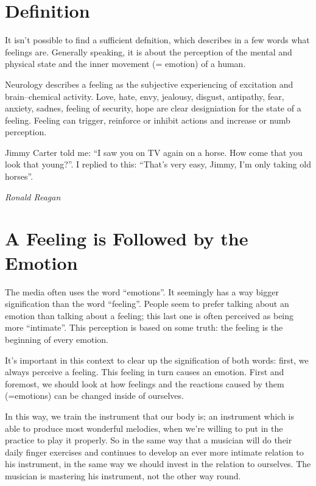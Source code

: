 \documentclass[../main.tex]{subfiles}
\begin{document}
\section{Definition}

It isn't possible to find a sufficient defnition, which describes in a few words what feelings are.
Generally speaking, it is about the perception of the mental and physical state and the inner movement (= emotion) of a human.

Neurology describes a feeling as the subjective experiencing of excitation and brain--chemical activity.
Love, hate, envy, jealousy, disgust, antipathy, fear, anxiety, sadnes, feeling of security, hope are clear designiation for the state of a feeling.
Feeling can trigger, reinforce or inhibit actions and increase or numb perception.

\epigraph{Jimmy Carter told me: ``I saw you on TV again on a horse. How come that you look that young?''. I replied to this: ``That's very easy, Jimmy, I'm only taking old horses''.}{\textit{Ronald Reagan}}

\section{A Feeling is Followed by the Emotion}

The media often uses the word ``emotions''.
It seemingly has a way bigger signification than the word ``feeling''.
People seem to prefer talking about an emotion than talking about a feeling; this last one is often perceived as being more ``intimate''.
This perception is based on some truth: the feeling is the beginning of every emotion.

It's important in this context to clear up the signification of both words: first, we always perceive a feeling.
This feeling in turn causes an emotion.
First and foremost, we should look at how feelings and the reactions caused by them (=emotions) can be changed inside of ourselves.

In this way, we train the instrument that our body is;
an instrument which is able to produce most wonderful melodies, when we're willing to put in the practice to play it properly.
So in the same way that a musician will do their daily finger exercises and continues to develop an ever more intimate relation to his instrument,
in the same way we should invest in the relation to ourselves.
The musician is mastering his instrument, not the other way round.
\end{document}
